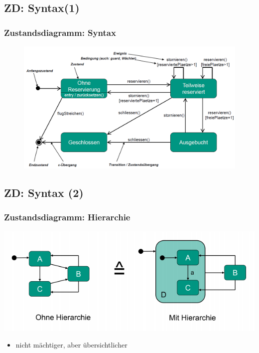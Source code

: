 \documentclass[18pt]{beamer}
\begin{document}
	\subsection{ZD: Syntax(1)}
	\begin{frame}
		\frametitle{Zustandsdiagramm: Syntax}
		\begin{figure}
			\includegraphics[scale=0.4]{./pics/tut2/auto_swt.png}
		\end{figure}	
	\end{frame}

	\subsection{ZD: Syntax (2)}
	\begin{frame}
		\frametitle{Zustandsdiagramm: Hierarchie}
		\includegraphics[scale=0.7]{./pics/tut2/auto_hier.png}	
		\begin{itemize}
			\item nicht mächtiger, aber übersichtlicher
		\end{itemize}
	\end{frame}
\end{document}
